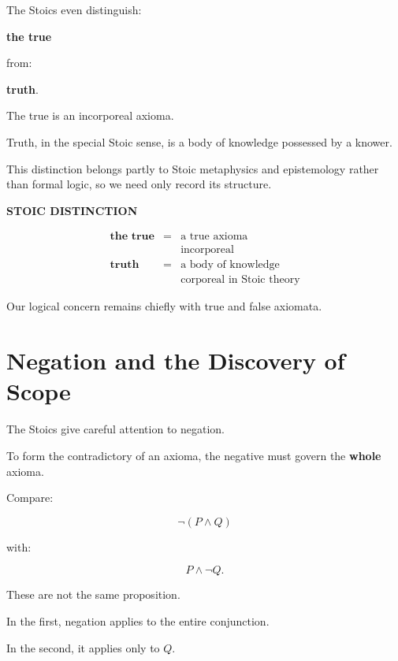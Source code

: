 \documentclass[11pt]{article}
\begin{document}
The Stoics even distinguish:

\begin{center}
\textbf{the true}
\end{center}

from:

\begin{center}
\textbf{truth}.
\end{center}

The true is an incorporeal axioma.

Truth, in the special Stoic sense, is a body of knowledge
possessed by a knower.

This distinction belongs partly to Stoic metaphysics and
epistemology rather than formal logic, so we need only record its
structure.

\begin{whiteboard}
\textbf{STOIC DISTINCTION}

\[
\begin{array}{rcl}
\textbf{the true}
&=&
\text{a true axioma}
\\
&&
\text{incorporeal}
\\[0.7em]
\textbf{truth}
&=&
\text{a body of knowledge}
\\
&&
\text{corporeal in Stoic theory}
\end{array}
\]
\end{whiteboard}

Our logical concern remains chiefly with true and false axiomata.

\section{Negation and the Discovery of Scope}

The Stoics give careful attention to negation.

To form the contradictory of an axioma, the negative must govern
the \textbf{whole} axioma.

Compare:

\[
\neg(P\land Q)
\]

with:

\[
P\land\neg Q.
\]

These are not the same proposition.

In the first, negation applies to the entire conjunction.

In the second, it applies only to \(Q\).
\end{document}
